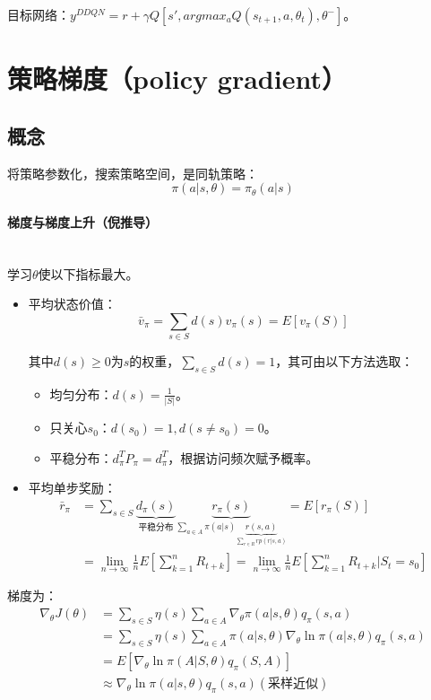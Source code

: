 \documentclass[
12pt, %
a4paper, 
oneside, %
headinclude,footinclude, %
]{scrartcl}
\begin{document}
目标网络：$ y^{DDQN} = r + \gamma Q[s', argmax_a Q(s_{t + 1}, a, \theta_t), \theta^-] $。
\section[策略梯度]{策略梯度（policy gradient）}
\subsection[概念]{概念}
将策略参数化，搜索策略空间，是同轨策略：
$$ \pi(a|s, \theta) = \pi_{\theta}(a|s) $$
\paragraph{梯度与梯度上升（倪推导）}~\\

学习$ \theta $使以下指标最大。
\begin{itemize}
\item 平均状态价值：
$$ \bar{v}_\pi = \sum_{s \in S} d(s) v_\pi(s) = E[v_\pi(S)] $$

其中$ d(s) \geq 0 $为$ s $的权重，$ \sum_{s \in S} d(s) = 1 $，其可由以下方法选取：
\begin{itemize}
\item 均匀分布：$ d(s) = \frac{1}{|S|} $。
\item 只关心$ s_0 $：$ d(s_0) = 1, d(s \neq s_0) = 0 $。
\item 平稳分布：$ d_{\pi}^T P_{\pi} = d_{\pi}^T $，根据访问频次赋予概率。
\end{itemize}
\item 平均单步奖励：
\begin{align*}
\bar{r}_\pi &= \sum_{s \in S} \underbrace{d_{\pi}(s)}_{\text{平稳分布}} \underbrace{r_\pi(s)}_{\sum_{a \in A} \pi(a|s)\underbrace{r(s, a)}_{\sum_{r \in R} r p(r|s, a)}} = E[r_\pi(S)] \\
&= \lim_{n \to \infty} \frac{1}{n}E[\sum_{k = 1}^{n} R_{t + k}] = \lim_{n \to \infty} \frac{1}{n}E[\sum_{k = 1}^{n} R_{t + k}|S_t = s_0]
\end{align*}
\end{itemize}

梯度为：
\begin{align*}
\nabla_\theta J(\theta) &= \sum_{s \in S} \eta(s) \sum_{a \in A} \nabla_\theta \pi(a|s, \theta) q_\pi(s, a) \\
&= \sum_{s \in S} \eta(s) \sum_{a \in A} \pi(a|s, \theta) \nabla_\theta \ln \pi(a|s, \theta) q_\pi(s, a) \\
&= E[\nabla_\theta \ln \pi(A|S, \theta) q_\pi(S, A)] \\
&\approx \nabla_\theta \ln \pi(a|s, \theta) q_\pi(s, a) (\text{采样近似})
\end{align*}
\end{document}
